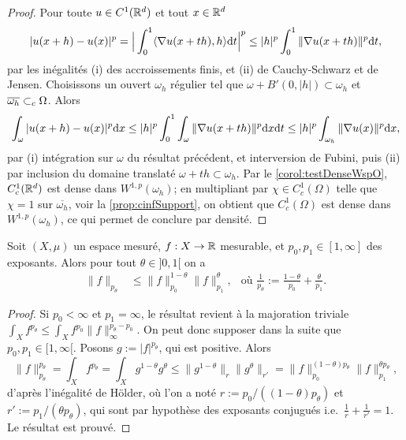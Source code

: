 \begin{proof}
	Pour toute $u \in C^1(\mathbb{R}^d)$ et tout $x \in \mathbb{R}^d$
	\begin{equation*}
		|u(x+h)-u(x)|^p = \Big|\int_0^1 \langle\nabla u(x+t h),h\rangle \mathrm{d} t\Big|^p \leq |h|^p \int_0^1 \|\nabla u(x+th)\|^p \mathrm{d} t,
	\end{equation*}
	par les inégalités (i) des accroissements finis, et (ii) de Cauchy-Schwarz et de Jensen.
	Choisissons un ouvert $\omega_h$ régulier tel que $\omega + B'(0,|h|) \subset \omega_h$ et $\overline {\omega_h} \subset_c \Omega$. Alors 
	\begin{equation*}
		\int_\omega |u(x+h)-u(x)|^p \mathrm{d} x \leq |h|^p \int_0^1 \int_\omega \|\nabla u(x+t h) \|^p \mathrm{d} x \mathrm{d} t \leq |h|^p \int_{\omega_h} \|\nabla u(x)\|^p \mathrm{d} x,
	\end{equation*}
	par (i) intégration sur $\omega$ du résultat précédent, et interversion de Fubini, puis (ii) par inclusion du domaine translaté $\omega + t h \subset \omega_h$. 
	Par le \cref{corol:testDenseWspO}, $C^1_c (\mathbb{R}^d)$ est dense dans $W^{1,p}(\omega_h)$; en multipliant par $\chi \in C^1_c(\Omega)$ telle que $\chi=1$ sur $\overline{\omega_h}$, voir la \cref{prop:cinfSupport}, on obtient que $C^1_c (\Omega)$ est dense dans $W^{1,p}(\omega_h)$, ce qui permet de conclure par densité.
\end{proof}

\begin{proposition}
\label{prop:interpLp}
%
	Soit $(X,\mu)$ un espace mesuré, $f: X \to \mathbb{R}$ mesurable, et $p_0,p_1\in [1,\infty]$ des exposants. Alors pour tout $\theta \in ]0,1[$ on a
	\begin{align*}
		\|f\|_{p_\theta} &\leq \|f\|_{p_0}^{1-\theta} \|f\|_{p_1}^\theta, &
		\text{où } \frac 1 {p_\theta} := \frac {1-\theta} {p_0} + \frac \theta {p_1}.
	\end{align*}
\end{proposition}

\begin{proof}
	Si $p_0<\infty$ et $p_1 = \infty$, le résultat revient à la majoration triviale $\int_X f^{p_\theta} \leq \int_X f^{p_0} \|f\|_\infty^{p_\theta-p_0}$. On peut donc supposer dans la suite que $p_0,p_1 \in [1,\infty[$.
	Posons $g := |f|^{p_\theta}$, qui est positive. Alors 
	\begin{equation*}
		\|f\|_{p_\theta}^{p_\theta} = \int_X f^{p_\theta} = \int_X g^{1-\theta} g^\theta  \leq \|g^{1-\theta} \|_r \| g^\theta \|_{r'} = \|f\|_{p_0}^{(1-\theta) p_\theta} \|f\|_{p_1}^{\theta p_\theta},
	\end{equation*}
	d'après l'inégalité de Hölder, 
	où l'on a noté $r := p_0/{((1-\theta) p_\theta)}$ et $r':=p_1/(\theta p_\theta)$, qui sont par hypothèse des exposants conjugués i.e.\ $\frac 1 r + \frac 1 {r'} = 1$. Le résultat est prouvé.
\end{proof}

